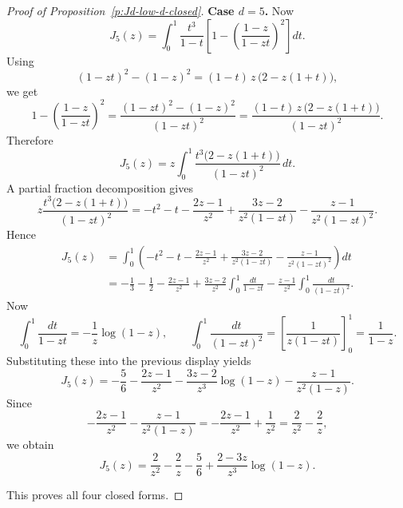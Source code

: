 \documentclass{article}
\begin{document}
\begin{proof}[Proof of Proposition~\ref{p:Jd-low-d-closed}]
\textbf{Case \(d=5\).}
Now
\[
J_5(z)=\int_0^1 \frac{t^3}{1-t}\left[1-\left(\frac{1-z}{1-zt}\right)^2\right]dt.
\]
Using
\[
(1-zt)^2-(1-z)^2
=(1-t)\,z\,\bigl(2-z(1+t)\bigr),
\]
we get
\[
1-\left(\frac{1-z}{1-zt}\right)^2
=
\frac{(1-zt)^2-(1-z)^2}{(1-zt)^2}
=
\frac{(1-t)\,z\,\bigl(2-z(1+t)\bigr)}{(1-zt)^2}.
\]
Therefore
\[
J_5(z)=z\int_0^1 \frac{t^3\bigl(2-z(1+t)\bigr)}{(1-zt)^2}\,dt.
\]
A partial fraction decomposition gives
\[
z\frac{t^3\bigl(2-z(1+t)\bigr)}{(1-zt)^2}
=
-t^2-t-\frac{2z-1}{z^2}
+\frac{3z-2}{z^2(1-zt)}
-\frac{z-1}{z^2(1-zt)^2}.
\]
Hence
\begin{align*}
J_5(z)
&=\int_0^1\left(
-t^2-t-\frac{2z-1}{z^2}
+\frac{3z-2}{z^2(1-zt)}
-\frac{z-1}{z^2(1-zt)^2}
\right)dt \\
&=
-\frac13-\frac12-\frac{2z-1}{z^2}
+\frac{3z-2}{z^2}\int_0^1\frac{dt}{1-zt}
-\frac{z-1}{z^2}\int_0^1\frac{dt}{(1-zt)^2}.
\end{align*}
Now
\[
\int_0^1 \frac{dt}{1-zt}
=-\frac{1}{z}\log(1-z),
\qquad
\int_0^1 \frac{dt}{(1-zt)^2}
=\left[\frac{1}{z(1-zt)}\right]_0^1
=\frac{1}{1-z}.
\]
Substituting these into the previous display yields
\[
J_5(z)
=
-\frac{5}{6}
-\frac{2z-1}{z^2}
-\frac{3z-2}{z^3}\log(1-z)
-\frac{z-1}{z^2(1-z)}.
\]
Since
\[
-\frac{2z-1}{z^2}-\frac{z-1}{z^2(1-z)}
=
-\frac{2z-1}{z^2}+\frac{1}{z^2}
=
\frac{2}{z^2}-\frac{2}{z},
\]
we obtain
\[
J_5(z)=\frac{2}{z^2}-\frac{2}{z}-\frac{5}{6}
+\frac{2-3z}{z^3}\log(1-z).
\]

This proves all four closed forms.
\end{proof}
\end{document}
